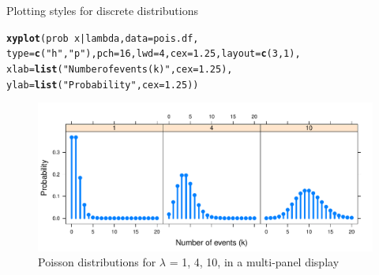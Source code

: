 \documentclass[11pt]{book}\usepackage[]{graphicx}\usepackage[]{color}
\makeatletter
\newcommand{\hlnum}[1]{\textcolor[rgb]{0.686,0.059,0.569}{#1}}%
\newcommand{\hlstr}[1]{\textcolor[rgb]{0.192,0.494,0.8}{#1}}%
\newcommand{\hlopt}[1]{\textcolor[rgb]{0,0,0}{#1}}%
\newcommand{\hlstd}[1]{\textcolor[rgb]{0.345,0.345,0.345}{#1}}%
\newcommand{\hlkwc}[1]{\textcolor[rgb]{0.333,0.667,0.333}{#1}}%
\newcommand{\hlkwd}[1]{\textcolor[rgb]{0.737,0.353,0.396}{\textbf{#1}}}%
\newenvironment{kframe}{%
 \def\at@end@of@kframe{}%
 \ifinner\ifhmode%
  \def\at@end@of@kframe{\end{minipage}}%
  \begin{minipage}{\columnwidth}%
 \fi\fi%
 \def\FrameCommand##1{\hskip\@totalleftmargin \hskip-\fboxsep
 \colorbox{shadecolor}{##1}\hskip-\fboxsep
     \hskip-\linewidth \hskip-\@totalleftmargin \hskip\columnwidth}%
 \MakeFramed {\advance\hsize-\width
   \@totalleftmargin\z@ \linewidth\hsize
   \@setminipage}}%
 {\par\unskip\endMakeFramed%
 \at@end@of@kframe}
\newenvironment{knitrout}{}{} %
\renewenvironment{knitrout}{\small\renewcommand{\baselinestretch}{.85}}{} %
\makeatother
\begin{document}
\begin{Example}{Plotting styles for discrete distributions}
\begin{knitrout}
\color{fgcolor}\begin{kframe}
\begin{alltt}
\hlkwd{xyplot}\hlstd{( prob} \hlopt{~} \hlstd{x} \hlopt{|} \hlstd{lambda,} \hlkwc{data}\hlstd{=pois.df,}
  \hlkwc{type}\hlstd{=}\hlkwd{c}\hlstd{(}\hlstr{"h"}\hlstd{,} \hlstr{"p"}\hlstd{),} \hlkwc{pch}\hlstd{=}\hlnum{16}\hlstd{,} \hlkwc{lwd}\hlstd{=}\hlnum{4}\hlstd{,} \hlkwc{cex}\hlstd{=}\hlnum{1.25}\hlstd{,} \hlkwc{layout}\hlstd{=}\hlkwd{c}\hlstd{(}\hlnum{3}\hlstd{,}\hlnum{1}\hlstd{),}
  \hlkwc{xlab}\hlstd{=}\hlkwd{list}\hlstd{(}\hlstr{"Number of events (k)"}\hlstd{,} \hlkwc{cex}\hlstd{=}\hlnum{1.25}\hlstd{),}
  \hlkwc{ylab}\hlstd{=}\hlkwd{list}\hlstd{(}\hlstr{"Probability"}\hlstd{,}  \hlkwc{cex}\hlstd{=}\hlnum{1.25}\hlstd{))}
\end{alltt}
\end{kframe}\begin{figure}[htbp]


\centerline{\includegraphics[width=\textwidth]{ch03/fig/dpois-xyplot1} }

\caption[Poisson distributions for $\lambda$ = 1, 4, 10, in a multi-panel display]{Poisson distributions for $\lambda$ = 1, 4, 10, in a multi-panel display\label{fig:dpois-xyplot1}}
\end{figure}


\end{knitrout}



\end{Example}
\end{document}
